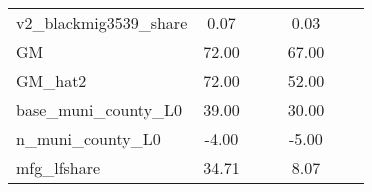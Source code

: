 \begin{table}[htbp]
\begin{tabular}{l*{2}{ccc}}
v2\_blackmig3539\_share&        0.07&            &            &        0.03&            &            \\
GM                  &       72.00&            &            &       67.00&            &            \\
GM\_hat2             &       72.00&            &            &       52.00&            &            \\
base\_muni\_county\_L0 &       39.00&            &            &       30.00&            &            \\
n\_muni\_county\_L0    &       -4.00&            &            &       -5.00&            &            \\
mfg\_lfshare         &       34.71&            &            &        8.07&            &            \\
\bottomrule
\end{tabular}
\end{table}
